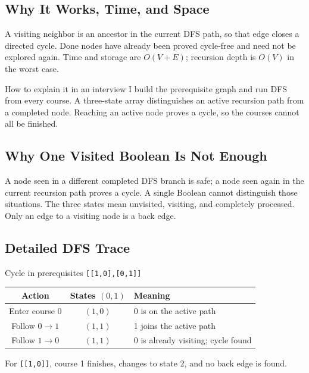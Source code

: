 \subsection{Why It Works, Time, and Space}
A visiting neighbor is an ancestor in the current DFS path, so that edge closes
a directed cycle. Done nodes have already been proved cycle-free and need not
be explored again. Time and storage are \(O(V+E)\); recursion depth is
\(O(V)\) in the worst case.

\begin{revisionbox}{How to explain it in an interview}
I build the prerequisite graph and run DFS from every course. A three-state
array distinguishes an active recursion path from a completed node. Reaching
an active node proves a cycle, so the courses cannot all be finished.
\end{revisionbox}

\subsection{Why One Visited Boolean Is Not Enough}
A node seen in a different completed DFS branch is safe; a node seen again in
the current recursion path proves a cycle. A single Boolean cannot distinguish
those situations. The three states mean unvisited, visiting, and completely
processed. Only an edge to a visiting node is a back edge.

\subsection{Detailed DFS Trace}
\begin{dryrunbox}{Cycle in prerequisites \texttt{[[1,0],[0,1]]}}
\begin{center}
\begin{tabularx}{\linewidth}{@{}c c X@{}}
\toprule
Action & States \((0,1)\) & Meaning \\
\midrule
Enter course 0 & \((1,0)\) & 0 is on the active path \\
Follow \(0\to1\) & \((1,1)\) & 1 joins the active path \\
Follow \(1\to0\) & \((1,1)\) & 0 is already visiting; cycle found \\
\bottomrule
\end{tabularx}
\end{center}
For \texttt{[[1,0]]}, course 1 finishes, changes to state 2, and no back edge
is found.
\end{dryrunbox}

